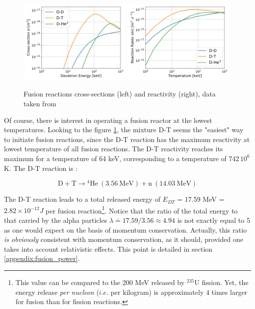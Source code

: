 \begin{figure} 
    \begin{center}
        \includegraphics[width=0.49\textwidth]{figures/Fusion_cross-section.png}
        \includegraphics[width=0.49\textwidth]{figures/Fusion_Reactivity.png}
        \caption{Fusion reactions cross-sections (left) and reactivity (right), data taken from \cite{Huba2013} }
        \label{fig:reactivity}
    \end{center}
\end{figure}

Of course, there is interest in operating a fusion reactor at the lowest temperatures. Looking to the figure \ref{fig:reactivity}, the mixture D-T seems the "easiest" way to initiate fusion reactions, since the D-T reaction  has the maximum reactivity at lowest temperature of all fusion reactions. The D-T reactivity reaches its maximum for a temperature of 64 keV, corresponding to a temperature of $742\,10^6$ K. The D-T reaction is \cite{FusionCEA1987}: 

\begin{equation*}
    \mathrm{D + T} \longrightarrow \mathrm{{}^4 He~(3.56~MeV) + n~(14.03~MeV)}
\end{equation*}

The D-T reaction leads to a total released energy of $E_{DT}$ = 17.59 \si{MeV} = $2.82\times 10^{-12} \si{J}$ per fusion reaction\footnote{This value can be compared to the 200 MeV released by $^{235}$U fission. Yet, the energy release \emph{per nucleon} ($i.e.$ per kilogram) is approximately 4 times larger for fusion than for fission reactions.}. Notice that the ratio of the total energy to that carried by the alpha particles $\lambda \doteq 17.59/3.56 \approx 4.94$ is not exactly equal to 5 as one would expect on the basis of momentum conservation. Actually, this ratio \emph{is obviously} consistent with momentum conservation, as it should, provided one takes into account relativistic effects. This point is detailed in section \ref{appendix:fusion_power}.

